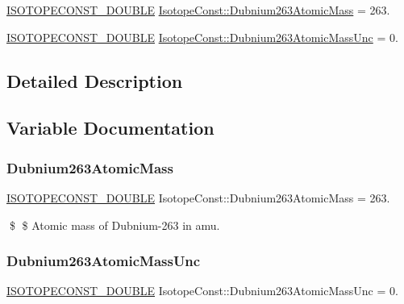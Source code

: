 \begin{DoxyCompactItemize}
\item 
\mbox{\hyperlink{group___isotope_const-_macros_ga8f45a7272ce02c0b4c65c44636ed719a}{I\+S\+O\+T\+O\+P\+E\+C\+O\+N\+S\+T\+\_\+\+D\+O\+U\+B\+LE}} \mbox{\hyperlink{group___isotope_const-_dubnium-_db263_ga8b18e283d7aa29fb9c9105b8247921d6}{Isotope\+Const\+::\+Dubnium263\+Atomic\+Mass}} = 263.
\item 
\mbox{\hyperlink{group___isotope_const-_macros_ga8f45a7272ce02c0b4c65c44636ed719a}{I\+S\+O\+T\+O\+P\+E\+C\+O\+N\+S\+T\+\_\+\+D\+O\+U\+B\+LE}} \mbox{\hyperlink{group___isotope_const-_dubnium-_db263_gade0b676ba34e3f419a6ad8eb0c5a6b81}{Isotope\+Const\+::\+Dubnium263\+Atomic\+Mass\+Unc}} = 0.
\end{DoxyCompactItemize}


\subsection{Detailed Description}


\subsection{Variable Documentation}
\mbox{\label{group___isotope_const-_dubnium-_db263_ga8b18e283d7aa29fb9c9105b8247921d6}} 
\subsubsection{\texorpdfstring{Dubnium263\+Atomic\+Mass}{Dubnium263AtomicMass}}
{\footnotesize\ttfamily \mbox{\hyperlink{group___isotope_const-_macros_ga8f45a7272ce02c0b4c65c44636ed719a}{I\+S\+O\+T\+O\+P\+E\+C\+O\+N\+S\+T\+\_\+\+D\+O\+U\+B\+LE}} Isotope\+Const\+::\+Dubnium263\+Atomic\+Mass = 263.}

\$ \$ Atomic mass of Dubnium-\/263 in amu. \mbox{\label{group___isotope_const-_dubnium-_db263_gade0b676ba34e3f419a6ad8eb0c5a6b81}} 
\subsubsection{\texorpdfstring{Dubnium263\+Atomic\+Mass\+Unc}{Dubnium263AtomicMassUnc}}
{\footnotesize\ttfamily \mbox{\hyperlink{group___isotope_const-_macros_ga8f45a7272ce02c0b4c65c44636ed719a}{I\+S\+O\+T\+O\+P\+E\+C\+O\+N\+S\+T\+\_\+\+D\+O\+U\+B\+LE}} Isotope\+Const\+::\+Dubnium263\+Atomic\+Mass\+Unc = 0.}

